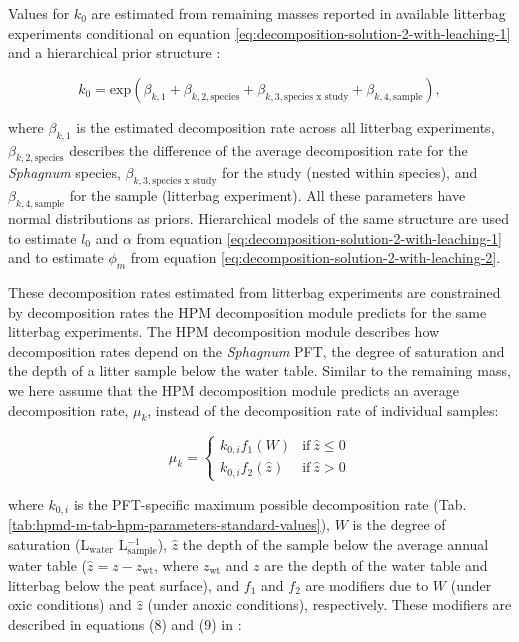 \documentclass[esd, manuscript]{copernicus}
\begin{document}
Values for \(k_0\) are estimated from remaining masses reported in available litterbag experiments conditional on equation \eqref{eq:decomposition-solution-2-with-leaching-1} and a hierarchical prior structure \citep{Teickner.2025}:

\begin{equation}
k_0 =  \text{exp}(\beta_{k,1} + \beta_{k,2,\text{species}} + \beta_{k,3,\text{species x study}} + \beta_{k,4,\text{sample}}),
\label{eq:model-link-2}
\end{equation}

where \(\beta_{k,1}\) is the estimated decomposition rate across all litterbag experiments, \(\beta_{k,2,\text{species}}\) describes the difference of the average decomposition rate for the \emph{Sphagnum} species, \(\beta_{k,3,\text{species x study}}\) for the study (nested within species), and \(\beta_{k,4,\text{sample}}\) for the sample (litterbag experiment). All these parameters have normal distributions as priors. Hierarchical models of the same structure are used to estimate \(l_0\) and \(\alpha\) from equation \eqref{eq:decomposition-solution-2-with-leaching-1} and to estimate \(\phi_m\) from equation \eqref{eq:decomposition-solution-2-with-leaching-2}.

These decomposition rates estimated from litterbag experiments are constrained by decomposition rates the HPM decomposition module \citep{Frolking.2010} predicts for the same litterbag experiments. The HPM decomposition module describes how decomposition rates depend on the \emph{Sphagnum} PFT, the degree of saturation and the depth of a litter sample below the water table. Similar to the remaining mass, we here assume that the HPM decomposition module predicts an average decomposition rate, \(\mu_k\), instead of the decomposition rate of individual samples:

\begin{equation}
\mu_k = \begin{cases}
k_{0,i} f_1(W) & \mathrm{if}~ \hat{z} \le 0\\
k_{0,i} f_2(\hat{z}) & \mathrm{if}~\hat{z}>0
\label{eq:hpm-decomposition-rate-1}
\end{cases}
\end{equation}

where \(k_{0,i}\) is the PFT-specific maximum possible decomposition rate (Tab. \ref{tab:hpmd-m-tab-hpm-parameters-standard-values}), \(W\) is the degree of saturation (L\(_\text{water}\) L\(_\text{sample}^{-1}\)), \(\hat{z}\) the depth of the sample below the average annual water table (\(\hat{z} = z - z_\text{wt}\), where \(z_\text{wt}\) and \(z\) are the depth of the water table and litterbag below the peat surface), and \(f_1\) and \(f_2\) are modifiers due to \(W\) (under oxic conditions) and \(\hat{z}\) (under anoxic conditions), respectively. These modifiers are described in equations (8) and (9) in \citet{Frolking.2010}:
\end{document}
